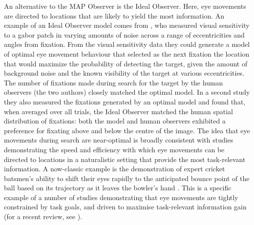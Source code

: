 \documentclass[preprint, authoryear]{elsarticle} %
\begin{document}
An alternative to the MAP Observer is the Ideal Observer. Here, eye movements are directed to locations that are likely to yield the most information. An example of an Ideal Observer model comes from \cite{najemnik-geisler2005}, who measured visual sensitivity to a gabor patch in varying amounts of noise across a range of eccentricities and angles from fixation. From the visual sensitivity data they could generate a model of optimal eye movement behaviour that selected as the next fixation the location that would maximize the probability of detecting the target, given the amount of background noise and the known visibility of the target at various eccentricities. The number of fixations made during search for the target by the human observers (the two authors) closely matched the optimal model. In a second study \citep{najemnik-geisler2008} they also measured the fixations generated by an optimal model and found that, when averaged over all trials, the Ideal Observer matched the human spatial distribution of fixations: both the model and human observers exhibited a preference for fixating above and below the centre of the image. The idea that eye movements during search are near-optimal is broadly consistent with studies demonstrating the speed and efficiency with which eye movements can be directed to locations in a naturalistic setting that provide the most task-relevant information. A now-classic example is the demonstration of expert cricket batsmen's ability to shift their eyes rapidly to the anticipated bounce point of the ball based on its trajectory as it leaves the bowler's hand \citep{land2000}. This is a specific example of a number of studies demonstrating that eye movements are tightly constrained by task goals, and driven to maximise task-relevant information gain (for a recent review, see \citet{hayhoe2014}). 

\par
\end{document}
